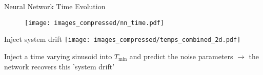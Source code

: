 \documentclass[aspectratio=169]{beamer}
\begin{document}


\begin{frame}{\small{Neural Network Time Evolution}}
    \begin{figure}
        \centering
        \texttt{[image: images\_compressed/nn\_time.pdf]}
    \end{figure}
\end{frame}

\begin{frame}{\small{Inject system drift}}
	\centering
	\texttt{[image: images\_compressed/temps\_combined\_2d.pdf]}
	\begin{tcolorbox}[colback=blue!5!white,colframe=blue!75!black,title=]
		Inject a time varying sinusoid into $T_{\text{min}}$ and predict the noise parameters $\rightarrow$ the network recovers this 'system drift'
	\end{tcolorbox}
\end{frame}
\end{document}
